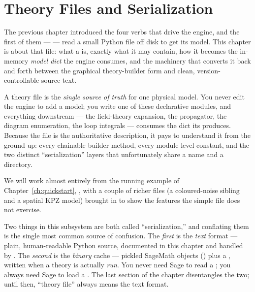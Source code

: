 \chapter{Theory Files and Serialization}\label{ch:theory-files}

The previous chapter introduced the four verbs that drive the engine, and the
first of them ---  --- read a small Python file off disk to
get its model. This chapter is about that file: what a  is,
exactly what it may contain, how it becomes the in-memory \emph{model dict} the
engine consumes, and the machinery that converts it back and forth between the
graphical theory-builder form and clean, version-controllable source text.

A theory file is the \emph{single source of truth} for one physical model. You
never edit the engine to add a model; you write one of these declarative
modules, and everything downstream --- the field-theory expansion, the
propagator, the diagram enumeration, the loop integrals --- consumes the dict
its  produces. Because the file is the authoritative description,
it pays to understand it from the ground up: every chainable builder method,
every module-level constant, and the two distinct ``serialization'' layers that
unfortunately share a name and a directory.

We will work almost entirely from the running example of
Chapter~\ref{ch:quickstart}, , with a
couple of richer files (a coloured-noise sibling and a spatial KPZ model) brought
in to show the features the simple file does not exercise.

\begin{note}
Two things in this subsystem are both called ``serialization,'' and conflating
them is the single most common source of confusion. The \emph{first} is the
 \emph{text} format --- plain, human-readable Python source,
documented in this chapter and handled by .
The \emph{second} is the  \emph{binary} cache ---
pickled SageMath objects () plus a , written when
a theory is actually \emph{run}. You never need Sage to read a ;
you always need Sage to load a . The last section of the chapter
disentangles the two; until then, ``theory file'' always means the text format.
\end{note}

